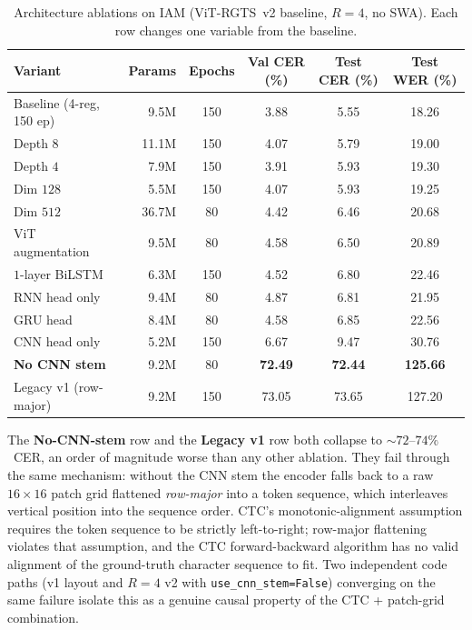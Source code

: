 \begin{table}[t]
\centering
\small
\caption{Architecture ablations on IAM (ViT-RGTS~v2 baseline, $R = 4$, no SWA). Each row changes one variable from the baseline.}
\label{tab:ablations}
\begin{tabular}{lrcccc}
\toprule
Variant & Params & Epochs & Val CER (\%) & Test CER (\%) & Test WER (\%) \\
\midrule
Baseline (4-reg, 150 ep) & 9.5M  & 150 & 3.88 & 5.55 & 18.26 \\
Depth $8$                & 11.1M & 150 & 4.07 & 5.79 & 19.00 \\
Depth $4$                & 7.9M  & 150 & 3.91 & 5.93 & 19.30 \\
Dim $128$                & 5.5M  & 150 & 4.07 & 5.93 & 19.25 \\
Dim $512$                & 36.7M & 80  & 4.42 & 6.46 & 20.68 \\
ViT augmentation         & 9.5M  & 80  & 4.58 & 6.50 & 20.89 \\
$1$-layer BiLSTM         & 6.3M  & 150 & 4.52 & 6.80 & 22.46 \\
RNN head only            & 9.4M  & 80  & 4.87 & 6.81 & 21.95 \\
GRU head                 & 8.4M  & 80  & 4.58 & 6.85 & 22.56 \\
CNN head only            & 5.2M  & 150 & 6.67 & 9.47 & 30.76 \\
\textbf{No CNN stem}     & 9.2M  & 80  & \textbf{72.49} & \textbf{72.44} & \textbf{125.66} \\
Legacy v1 (row-major)    & 9.2M  & 150 & 73.05 & 73.65 & 127.20 \\
\bottomrule
\end{tabular}
\end{table}

The \textbf{No-CNN-stem} row and the \textbf{Legacy v1} row both collapse to ${\sim}72$--$74\%$~CER, an order of magnitude worse than any other ablation. They fail through the same mechanism: without the CNN stem the encoder falls back to a raw $16 \times 16$ patch grid flattened \emph{row-major} into a token sequence, which interleaves vertical position into the sequence order. CTC's monotonic-alignment assumption requires the token sequence to be strictly left-to-right; row-major flattening violates that assumption, and the CTC forward-backward algorithm has no valid alignment of the ground-truth character sequence to fit. Two independent code paths (v1 layout and $R = 4$ v2 with \texttt{use\_cnn\_stem=False}) converging on the same failure isolate this as a genuine causal property of the CTC + patch-grid combination.

